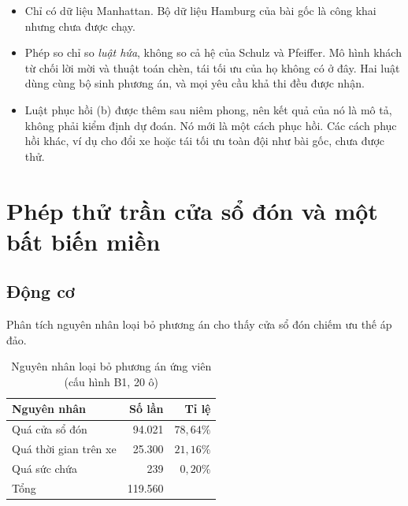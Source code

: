 \begin{itemize}
\begin{itemize}
  hứa bị phá: về số khách, hai luật vẫn lệch nhau chút ít, ví dụ ở 120 giây trên hai ô của phép quét, $C$
  phục vụ 190 và $M^{+}$ phục vụ 191 khách, và chỉ 1/2 ô ra cùng chuỗi quyết định với $C$.
  \item Khung 7:00--9:00 chỉ có hai ngày làm việc (12 và 13/11), và các ô của nó trùng một phần khách với
  các ô 8:00--10:00 đã chạy.
  \end{itemize}
\item Chỉ có dữ liệu Manhattan. Bộ dữ liệu Hamburg của bài gốc là công khai nhưng chưa được chạy.
\item Phép so chỉ so \emph{luật hứa}, không so cả hệ của Schulz và Pfeiffer. Mô hình khách từ chối lời mời
và thuật toán chèn, tái tối ưu của họ không có ở đây. Hai luật dùng cùng bộ sinh phương án, và mọi yêu
cầu khả thi đều được nhận.
\item Luật phục hồi (b) được thêm sau niêm phong, nên kết quả của nó là mô tả, không phải kiểm định dự
đoán. Nó mới là một cách phục hồi. Các cách phục hồi khác, ví dụ cho đổi xe hoặc tái tối ưu toàn đội như
bài gốc, chưa được thử.
\end{itemize}

\section{Phép thử trần cửa sổ đón và một bất biến miền}
\label{muc:cuaso}

\subsection{Động cơ}

Phân tích nguyên nhân loại bỏ phương án cho thấy cửa sổ đón chiếm ưu thế áp đảo.

\begin{table}[htbp]
\centering
\caption{Nguyên nhân loại bỏ phương án ứng viên (cấu hình B1, 20 ô)}
\label{bang:nguyennhan}
\small
\begin{tabular}{@{}lrr@{}}
\toprule
\textbf{Nguyên nhân} & \textbf{Số lần} & \textbf{Tỉ lệ}\\
\midrule
Quá cửa sổ đón & 94.021 & $78{,}64\%$\\
Quá thời gian trên xe & 25.300 & $21{,}16\%$\\
Quá sức chứa & 239 & $0{,}20\%$\\
\midrule
Tổng & 119.560 & \\
\bottomrule
\end{tabular}
\end{table}

